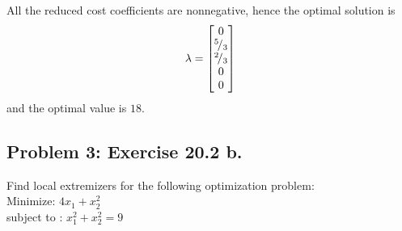 \documentclass{article}
\newcommand*\rfrac[2]{{}^{#1}\!/_{#2}}
\begin{document}
All the reduced cost coefficients are nonnegative, hence the optimal solution is \begin{align*} 
\lambda = \bmat{0 \\ \rfrac{5}{3} \\ \rfrac{2}{3} \\ 0\\ 0}  \end{align*} 
and the optimal value is $18$. 








\hypertarget{}{}
\subsection*{{Problem 3: Exercise 20.2 b. }}
\label{}
 Find  local extremizers for the following optimization problem: \\
 Minimize:  $ 4x_1 + x_2^2 $   \\
 subject to :  $ x_1^2 + x_2^2  = 9 $\\
 
\end{document}
